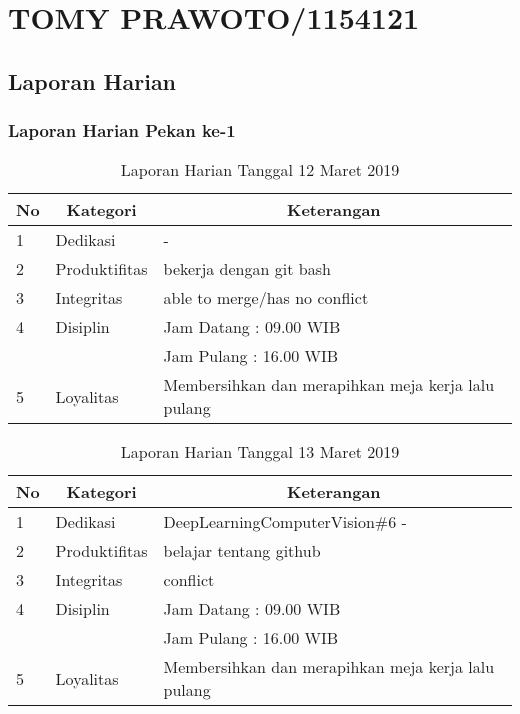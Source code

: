 \chapter{TOMY PRAWOTO/1154121}

\section{Laporan Harian}

\subsection{Laporan Harian Pekan ke-1}

\begin{table}[htp]
\caption{Laporan Harian Tanggal 12 Maret 2019}
\label{tab:lh120319}
\begin{tabular}{|l|l|l|}
\hline
\textbf{No} & \multicolumn{1}{c|}{\textbf{Kategori}} & \multicolumn{1}{c|}{\textbf{Keterangan}} \\ \hline
1 & Dedikasi & - \\ \hline
2 & Produktifitas & bekerja dengan git bash \\
3 & Integritas & able to merge/has no conflict \\ \hline
4 & Disiplin & Jam Datang : 09.00 WIB \\
 &  & Jam Pulang : 16.00 WIB \\ \hline
5 & Loyalitas & Membersihkan dan merapihkan meja kerja lalu pulang  \\ \hline
\end{tabular}
\end{table}

\begin{table}[htp]
\caption{Laporan Harian Tanggal 13 Maret 2019}
\label{tab:lh130319}
\begin{tabular}{|l|l|l|}
\hline
\textbf{No} & \multicolumn{1}{c|}{\textbf{Kategori}} & \multicolumn{1}{c|}{\textbf{Keterangan}} \\ \hline
1 & Dedikasi & DeepLearningComputerVision\#6 - \\ \hline
2 & Produktifitas & belajar tentang github \\
3 & Integritas & conflict \\ \hline
4 & Disiplin & Jam Datang : 09.00 WIB \\
 &  & Jam Pulang : 16.00 WIB \\ \hline
5 & Loyalitas & Membersihkan dan merapihkan meja kerja lalu pulang  \\ \hline
\end{tabular}
\end{table}

